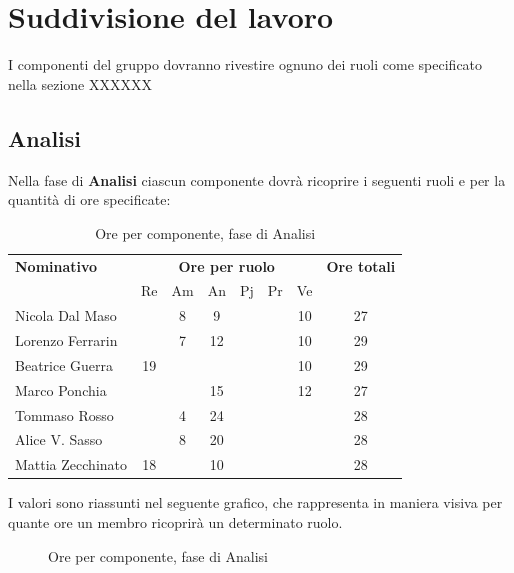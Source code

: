 \section{Suddivisione del lavoro}
I componenti del gruppo dovranno rivestire ognuno dei ruoli come specificato nella sezione XXXXXX
\subsection{Analisi}
Nella fase di \textbf{Analisi} ciascun componente dovrà ricoprire i seguenti ruoli e per la quantità di ore specificate:

\begin{table}[H]
	\centering
	\begin{tabular}{|l|c|c|c|c|c|c|c|}
		\hline
		\textbf{Nominativo} & 
		\multicolumn{6}{c|}{\textbf{Ore per ruolo}} & 
		\textbf{Ore totali} \\
		& Re & Am & An & Pj & Pr & Ve & \\
		\hline
		Nicola Dal Maso & & 8 & 9 & & & 10 & 27 \\
		Lorenzo Ferrarin & & 7 & 12 & & & 10 & 29 \\
		Beatrice Guerra & 19 & & & & & 10 & 29 \\
		Marco Ponchia & & & 15 & & & 12 & 27 \\
		Tommaso Rosso & & 4 & 24 & & & & 28 \\
		Alice V. Sasso & & 8 & 20 & & & & 28 \\
		Mattia Zecchinato & 18 & & 10 & & & & 28 \\
		\hline
	\end{tabular}
	\caption{Ore per componente, fase di Analisi}
\end{table}
I valori sono riassunti nel seguente grafico, che rappresenta in maniera visiva per quante ore un membro ricoprirà un determinato ruolo.
\begin{figure}[H]
	\centering
	\caption{Ore per componente, fase di Analisi}
\end{figure}



